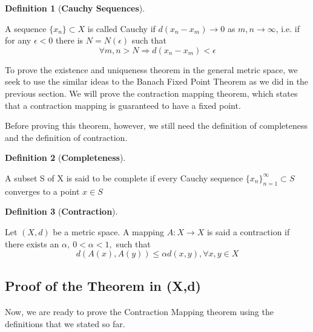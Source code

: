 \documentclass{article}
\theoremstyle{definition}
\newtheorem{definition}{Definition}[section]
\theoremstyle{remark}
\theoremstyle{example}
\begin{document}
\begin{definition}[\textbf{Cauchy Sequences}]\label{def:cauchySeq}

    A sequence $\{x_n\} \subset X$ is called Cauchy if $d(x_n - x_m) \rightarrow 0$ as $m,n \rightarrow \infty$, i.e. if for any $\epsilon < 0$ there is $N = N(\epsilon)$ such that
        \begin{equation}
            \forall m,n > N \Longrightarrow d(x_n - x_m) < \epsilon
        \end{equation}
\end{definition}

To prove the existence and uniqueness theorem in the general metric space, we seek to use the similar ideas to the Banach Fixed Point Theorem as we did in the previous section. We will prove the contraction mapping theorem, which states that a contraction mapping is guaranteed to have a fixed point.

Before proving this theorem, however, we still need the definition of completeness and the definition of contraction.

\begin{definition}[\textbf{Completeness}]\label{def:completeness}

    A subset S of X is said to be complete if every Cauchy sequence $\{x_n\}_{n = 1}^{\infty} \subset S$ converges to a point $x \in S$
\end{definition}

\begin{definition}[\textbf{Contraction}]\label{def:contraction}

    Let $(X,d)$ be a metric space. A mapping $A :X\rightarrow X$ is said a contraction if there exists an $\alpha,\ 0<\alpha<1,$ such that
        \begin{equation}
            d(A(x),A(y)) \leq \alpha d(x,y), \forall x,y \in X
        \end{equation}
\end{definition}

\subsection{Proof of the Theorem in (X,d)}

\paragraph{  }

Now, we are ready to prove the Contraction Mapping theorem using the definitions that we stated so far.
\end{document}
